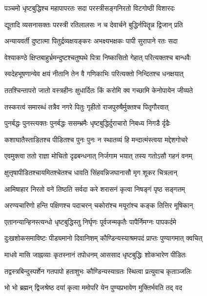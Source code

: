 \twolineshloka
{पञ्चमो धृष्टबुद्धिश्च महापापरतः सदा}
{परस्त्रीसङ्गनिरतो विटगोष्ठी विशारदः}%

\twolineshloka
{द्यूतादि व्यसनासक्तः परस्त्री रतिलालसः}
{न च देवार्चने बुद्धिर्नपितॄन्न द्विजान् प्रति}%

\twolineshloka
{अन्यायवर्ती दुष्टात्मा पितुर्द्रव्यक्षयङ्करः}
{अभक्ष्यभक्षकः पापी सुरापाने रतः सदा}%

\twolineshloka
{वेश्याकण्ठे क्षिप्तबाहुर्भ्रमन्दुष्टश्चतुष्पथे}
{पित्रा निष्कासितो गेहात् परित्यक्तश्च बान्धवैः}%

\twolineshloka
{स्वदेहभूषणान्येव क्षयं नीतानि तेन वै}
{गणिकाभिः परित्यक्तो निन्दितश्च धनक्षयात्}%

\twolineshloka
{ततश्चिन्तापरो जातो वस्त्रहीनः क्षुधार्दितः}
{किं करोमि क्व गच्छामि केनोपायेन जीव्यते}%

\twolineshloka
{तस्करत्वं समारब्धं तत्रैव नगरे पितुः}
{गृहीतो राजपुरुषैर्मुक्तश्च पितृगौरवात्}%

\twolineshloka
{पुनर्बद्धः पुनस्त्यक्तः पुनर्बद्धः ससम्भ्रमैः}
{धृष्टबुद्धिर्दुराचारो निबध्य निगडै र्दृढैः}%

\twolineshloka
{कशाघातैस्ताडितश्च पीडितश्च पुनः पुनः}
{न स्थातव्यं हि मन्दात्मंस्त्वया मद्देशगोचरे}%

\twolineshloka
{एवमुक्त्वा ततो राज्ञा मोचितो दृढबन्धनात्}
{निर्जगाम भयात् तस्य गतोऽसौ गहनं वनम्}%

\twolineshloka
{क्षुत्तृषापीडितश्चायमितश्चेतश्च धावति}
{सिंहवन्निजघानासौ मृग शूकर चित्रलान्}%

\twolineshloka
{आमिषाहार निरतो वने तिष्ठति सर्वदा}
{करे शरासनं कृत्वा निषङ्गं पृष्ठ सङ्गतम्}%

\twolineshloka
{अरण्यचारिणो हन्ति पक्षिणश्च पदाचरन्}
{चकोरांश्च मयूरांश्च कङ्क तित्तिर मूषिकान्}%

\twolineshloka
{एतानन्यान्हिनस्त्यन्धो धृष्टबुद्धिस्तु निर्घृणः}
{पूर्वजन्मकृतैः पापैर्निमग्नः पापकर्दमे}%

\twolineshloka
{दुःखशोकसमाविष्टः पीड्यमानो दिवानिशम्}
{कौण्डिन्यस्याश्रमपदं प्राप्तः पुण्यागमात् क्वचित्}%

\twolineshloka
{माधवे मासि जाह्नव्याः कृतस्नानं तपोधनम्}
{आससाद धृष्टबुद्धिः शोकभारेण पीडितः}%

\twolineshloka
{तद्वस्त्रबिन्दुस्पर्शेन गतपापो हताशुभः}
{कौण्डिन्यस्याग्रतः स्थित्वा प्रत्युवाच कृताञ्जलिः}%


\twolineshloka
{भो भो ब्रह्मन् द्विजश्रेष्ठ दयां कृत्वा ममोपरि}
{येन पुण्यप्रभावेण मुक्तिर्भवति तद् वद}%

